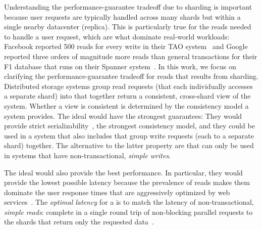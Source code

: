 Understanding the performance-guarantee tradeoff due to sharding is important because user requests are typically handled across many shards but within a single nearby datacenter (replica).
This is particularly true for the reads needed to handle a user request, which are what dominate real-world workloads:
Facebook reported 500 reads for every write in their TAO system~\cite{TAO2013} and
Google reported three orders of magnitude more reads than general transactions for their F1 database that runs on their Spanner system~\cite{Corbett:osdi2012}.
In this work, we focus on clarifying the performance-guarantee tradeoff for reads that results from sharding.
Distributed storage systems group read requests (that each individually accesses a separate shard) into \textit{\rots{}} that together return a consistent, cross-shard view of the system.
Whether a view is consistent is determined by the consistency model a system provides.
The ideal \rots{} would have the strongest guarantees:
They would provide strict serializability~\cite{Papadimitriou79}, the strongest consistency model,
and they could be used in a system that also includes \textit{\wots{}} that group write requests (each to a separate shard) together.
The alternative to the latter property are \rots{} that can only be used in systems that have non-transactional, \textit{simple writes}.

The ideal \rots{} would also provide the best performance.
In particular, they would provide the lowest possible latency because the prevalence of reads makes them dominate the user response times that are aggressively optimized by web services~\cite{latency:shopzilla, latency:amazon,
  latency:search}.
The \textit{optimal latency} for a \rot{} is to match the latency of non-transactional, \textit{simple reads}:
complete in a single round trip of non-blocking parallel requests to the shards that return only the requested data~\cite{SNOW2016}.

